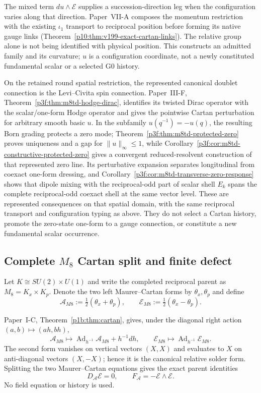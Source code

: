 \documentclass[12pt,a4paper]{article}
\begin{document}
The mixed term \(du\wedge\mathcal E\) supplies a succession-direction leg
when the configuration varies along that direction.  Paper~VII-A composes the
momentum restriction with the existing \(\iota_1\) transport to reciprocal
position before forming its native gauge links
(Theorem~\ref{p10:thm:v199-exact-cartan-links}).  The relative group alone
is not being identified with physical position.  This constructs an
admitted family and its curvature; \(u\) is a configuration coordinate,
not a newly constituted fundamental scalar or a selected G0 history.

On the retained round spatial restriction, the represented canonical
doublet connection is the Levi--Civita spin connection. Paper~III-F,
Theorem~\ref{p3f:thm:m8td-hodge-dirac}, identifies its twisted Dirac
operator with the scalar/one-form Hodge operator and gives the pointwise
Cartan perturbation for arbitrary smooth basic $u$. In the subfamily
$u(q^{-1})=-u(q)$, the resulting Born grading protects a zero mode;
Theorem~\ref{p3f:thm:m8td-protected-zero} proves uniqueness and a gap for
$\|u\|_\infty\le1$, while
Corollary~\ref{p3f:cor:m8td-constructive-protected-zero} gives a convergent
reduced-resolvent construction of that represented zero line. Its
perturbative expansion separates longitudinal from coexact one-form
dressing, and Corollary~\ref{p3f:cor:m8td-transverse-zero-response} shows
that dipole mixing with the reciprocal-odd part of scalar shell $E_k$
spans the complete reciprocal-odd coexact shell at the same vector level.
These are represented consequences on that spatial domain, with the same
reciprocal transport and configuration typing as above. They do not select
a Cartan history, promote the zero-state one-form to a gauge connection, or
constitute a new fundamental scalar occurrence.

\subsection{Complete $M_8$ Cartan split and finite defect}
\label{p3b:sec:v187-m8-cartan-defect}
Let $K\cong SU(2)\times U(1)$ and write the completed reciprocal parent as
$M_8=K_x\times K_p$.  Denote the two left Maurer--Cartan forms by
$\theta_x,\theta_p$ and define
\[
 \boxed{\mathcal A_{M8}:=\tfrac12(\theta_x+\theta_p),\qquad
 \mathcal E_{M8}:=\tfrac12(\theta_x-\theta_p).}
\]

\begin{theorem}
\label{p3b:thm:v187-m8-cartan-split}
Paper~I-C, Theorem~\ref{p1b:thm:cartan}, gives, under the diagonal right
action $(a,b)\mapsto(ah,bh)$,
\[
 \mathcal A_{M8}\mapsto
 \operatorname{Ad}_{h^{-1}}\mathcal A_{M8}+h^{-1}dh,
 \qquad
 \mathcal E_{M8}\mapsto
 \operatorname{Ad}_{h^{-1}}\mathcal E_{M8}.
\]
The second form vanishes on vertical vectors $(X,X)$ and evaluates to $X$ on
anti-diagonal vectors $(X,-X)$; hence it is the canonical relative solder
form.  Splitting the two Maurer--Cartan equations gives the exact parent
identities
\[
 \boxed{D_{\mathcal A}\mathcal E=0,\qquad
 F_{\mathcal A}=-\mathcal E\wedge\mathcal E.}
\]
No field equation or history is used.
\end{theorem}
\end{document}
